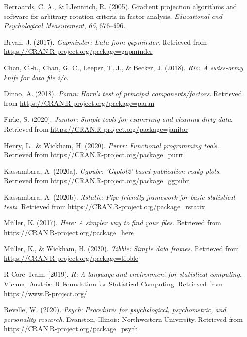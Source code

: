 \documentclass[
  english,
  man]{apa6}
\begin{document}
\leavevmode\hypertarget{ref-R-GPArotation}{}%
Bernaards, C. A., \& I.Jennrich, R. (2005). Gradient projection algorithms and software for arbitrary rotation criteria in factor analysis. \emph{Educational and Psychological Measurement}, \emph{65}, 676--696.

\leavevmode\hypertarget{ref-R-gapminder}{}%
Bryan, J. (2017). \emph{Gapminder: Data from gapminder}. Retrieved from \url{https://CRAN.R-project.org/package=gapminder}

\leavevmode\hypertarget{ref-R-rio}{}%
Chan, C.-h., Chan, G. C., Leeper, T. J., \& Becker, J. (2018). \emph{Rio: A swiss-army knife for data file i/o}.

\leavevmode\hypertarget{ref-R-paran}{}%
Dinno, A. (2018). \emph{Paran: Horn's test of principal components/factors}. Retrieved from \url{https://CRAN.R-project.org/package=paran}

\leavevmode\hypertarget{ref-R-janitor}{}%
Firke, S. (2020). \emph{Janitor: Simple tools for examining and cleaning dirty data}. Retrieved from \url{https://CRAN.R-project.org/package=janitor}

\leavevmode\hypertarget{ref-R-purrr}{}%
Henry, L., \& Wickham, H. (2020). \emph{Purrr: Functional programming tools}. Retrieved from \url{https://CRAN.R-project.org/package=purrr}

\leavevmode\hypertarget{ref-R-ggpubr}{}%
Kassambara, A. (2020a). \emph{Ggpubr: 'Ggplot2' based publication ready plots}. Retrieved from \url{https://CRAN.R-project.org/package=ggpubr}

\leavevmode\hypertarget{ref-R-rstatix}{}%
Kassambara, A. (2020b). \emph{Rstatix: Pipe-friendly framework for basic statistical tests}. Retrieved from \url{https://CRAN.R-project.org/package=rstatix}

\leavevmode\hypertarget{ref-R-here}{}%
Müller, K. (2017). \emph{Here: A simpler way to find your files}. Retrieved from \url{https://CRAN.R-project.org/package=here}

\leavevmode\hypertarget{ref-R-tibble}{}%
Müller, K., \& Wickham, H. (2020). \emph{Tibble: Simple data frames}. Retrieved from \url{https://CRAN.R-project.org/package=tibble}

\leavevmode\hypertarget{ref-R-base}{}%
R Core Team. (2019). \emph{R: A language and environment for statistical computing}. Vienna, Austria: R Foundation for Statistical Computing. Retrieved from \url{https://www.R-project.org/}

\leavevmode\hypertarget{ref-R-psych}{}%
Revelle, W. (2020). \emph{Psych: Procedures for psychological, psychometric, and personality research}. Evanston, Illinois: Northwestern University. Retrieved from \url{https://CRAN.R-project.org/package=psych}
\end{document}
